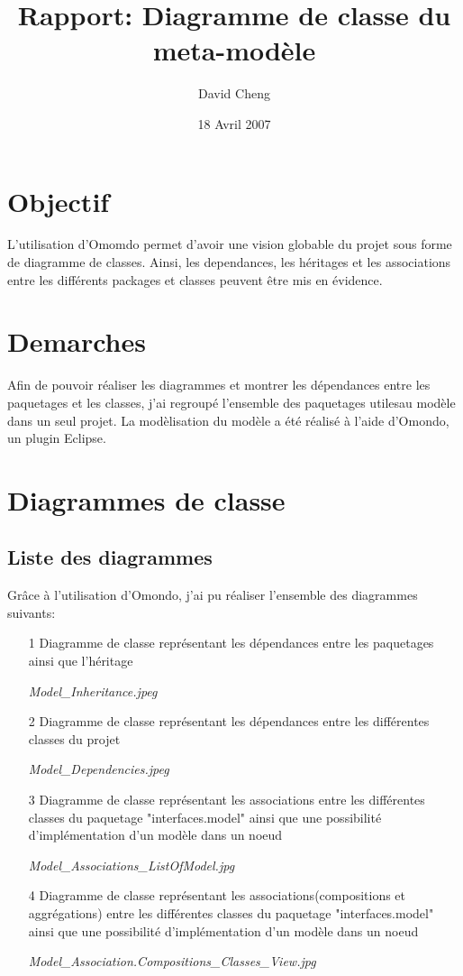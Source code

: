 \documentclass{article}
\title{Rapport: Diagramme de classe du meta-mod\`ele}
\author{David Cheng}
\date{18 Avril 2007}
\begin{document}
\maketitle
\section{Objectif}
\indent
L'utilisation d'Omomdo permet d'avoir une vision globable du projet sous forme de diagramme de classes.
Ainsi, les dependances, les h\'eritages et les associations entre les diff\'erents packages et classes peuvent \^etre mis en \'evidence.

\section{Demarches}
\indent
Afin de pouvoir r\'ealiser les diagrammes et montrer les d\'ependances entre les paquetages et les classes, j'ai regroup\'e l'ensemble des paquetages utilesau mod\`ele dans un seul projet.
La mod\`elisation du mod\`ele a \'et\'e r\'ealis\'e \`a l'aide d'Omondo, un plugin Eclipse.


\section{Diagrammes de classe}
\subsection{Liste des diagrammes}

Gr\^ace à l'utilisation d'Omondo, j'ai pu r\'ealiser l'ensemble des diagrammes suivants:

\begin{itemize}
\item[1] Diagramme de classe repr\'esentant les d\'ependances entre les paquetages ainsi que l'h\'eritage

\textit{Model\_Inheritance.jpeg}

\item[2] Diagramme de classe repr\'esentant les d\'ependances entre les diff\'erentes classes du projet

\textit{Model\_Dependencies.jpeg}

\item[3] Diagramme de classe représentant les associations
entre les différentes classes du paquetage "interfaces.model"
ainsi que une possibilité d'implémentation d'un modèle dans un noeud

\textit{Model\_Associations\_ListOfModel.jpg}

\item[4] Diagramme de classe repr\'esentant les associations(compositions et aggrégations) 
entre les différentes classes du paquetage "interfaces.model"
ainsi que une possibilité d'implémentation d'un modèle dans un noeud

\textit{Model\_Association.Compositions\_Classes\_View.jpg}
\end{itemize}
\end{document}
